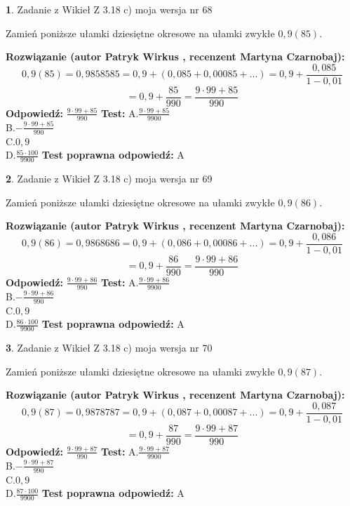 \documentclass[12pt, a4paper]{article}
\theoremstyle{definition} %
\newtheorem{zad}{}
\newcommand{\zadStart}[1]{\begin{zad}#1\newline}
\newcommand{\zadStop}{\end{zad}}
\newcommand{\rozwStart}[2]{\noindent \textbf{Rozwiązanie (autor #1 , recenzent #2): }\newline}
\newcommand{\rozwStop}{\newline}
\newcommand{\odpStart}{\noindent \textbf{Odpowiedź:}\newline}
\newcommand{\odpStop}{\newline}
\newcommand{\testStart}{\noindent \textbf{Test:}\newline}
\newcommand{\testStop}{\newline}
\newcommand{\kluczStart}{\noindent \textbf{Test poprawna odpowiedź:}\newline}
\newcommand{\kluczStop}{\newline}
\begin{document}
\zadStart{Zadanie z Wikieł Z 3.18 c) moja wersja nr 68}

Zamień poniższe ułamki dziesiętne okresowe na ułamki zwykłe $0,9(85)$.
\zadStop
\rozwStart{Patryk Wirkus}{Martyna Czarnobaj}
$$0,9(85)=0,9858585=0,9+(0,085+0,00085+...)=0,9+\frac{0,085}{1-0,01}$$
$$=0,9+\frac{85}{990}=\frac{9\cdot99+85}{990}$$
\rozwStop
\odpStart
$\frac{9\cdot99+85}{990}$
\odpStop
\testStart
A.$\frac{9\cdot99+85}{9900}$\\ B.$-\frac{9\cdot99+85}{990}$\\ C.$0,9$\\ D.$\frac{85\cdot100}{9900}$
\testStop
\kluczStart
A
\kluczStop



\zadStart{Zadanie z Wikieł Z 3.18 c) moja wersja nr 69}

Zamień poniższe ułamki dziesiętne okresowe na ułamki zwykłe $0,9(86)$.
\zadStop
\rozwStart{Patryk Wirkus}{Martyna Czarnobaj}
$$0,9(86)=0,9868686=0,9+(0,086+0,00086+...)=0,9+\frac{0,086}{1-0,01}$$
$$=0,9+\frac{86}{990}=\frac{9\cdot99+86}{990}$$
\rozwStop
\odpStart
$\frac{9\cdot99+86}{990}$
\odpStop
\testStart
A.$\frac{9\cdot99+86}{9900}$\\ B.$-\frac{9\cdot99+86}{990}$\\ C.$0,9$\\ D.$\frac{86\cdot100}{9900}$
\testStop
\kluczStart
A
\kluczStop



\zadStart{Zadanie z Wikieł Z 3.18 c) moja wersja nr 70}

Zamień poniższe ułamki dziesiętne okresowe na ułamki zwykłe $0,9(87)$.
\zadStop
\rozwStart{Patryk Wirkus}{Martyna Czarnobaj}
$$0,9(87)=0,9878787=0,9+(0,087+0,00087+...)=0,9+\frac{0,087}{1-0,01}$$
$$=0,9+\frac{87}{990}=\frac{9\cdot99+87}{990}$$
\rozwStop
\odpStart
$\frac{9\cdot99+87}{990}$
\odpStop
\testStart
A.$\frac{9\cdot99+87}{9900}$\\ B.$-\frac{9\cdot99+87}{990}$\\ C.$0,9$\\ D.$\frac{87\cdot100}{9900}$
\testStop
\kluczStart
A
\kluczStop
\end{document}
